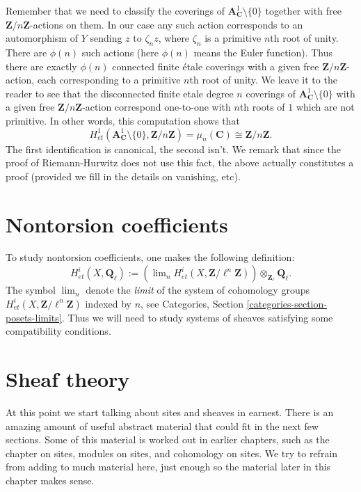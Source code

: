 \medskip\noindent
Remember that we need to classify the coverings of
${\mathbf{A}^1_\mathbf{C} \setminus \{0\}}$ together with free
$\mathbf{Z}/n\mathbf{Z}$-actions on them.
In our case any such action corresponds
to an automorphism of $Y$ sending $z$ to $\zeta_n z$, where $\zeta_n$ is a
primitive $n$th root of unity. There are $\phi(n)$ such actions
(here $\phi(n)$ means the Euler function). Thus there are exactly
$\phi(n)$ connected finite \'etale coverings with a given free
$\mathbf{Z}/n\mathbf{Z}$-action, each corresponding to a primitive
$n$th root of unity. We leave it to the reader to see that the
disconnected finite etale degree $n$ coverings of
$\mathbf{A}^1_{\mathbf{C}} \setminus \{0\}$ with a given free
$\mathbf{Z}/n\mathbf{Z}$-action correspond one-to-one with $n$th
roots of $1$ which are not primitive.
In other words, this computation shows that
$$
H_{et}^1 (\mathbf{A}^1_\mathbf{C} \setminus \{0\}, \mathbf{Z}/n\mathbf{Z})
= \mu_n(\mathbf{C}) \cong \mathbf{Z}/n\mathbf{Z}.
$$
The first identification is canonical, the second isn't. We remark that
since the proof of Riemann-Hurwitz does not use this fact, the above actually
constitutes a proof (provided we fill in the details on vanishing, etc).




\section{Nontorsion coefficients}
\label{section-nontorsion}

\noindent
To study nontorsion coefficients, one makes the following definition:
$$
H_{et}^i (X, \mathbf{Q}_\ell) :=
\left( \lim\nolimits_n H_{et}^i(X, \mathbf{Z}/\ell^n\mathbf{Z}) \right)
\otimes_{\mathbf{Z}_\ell} \mathbf{Q}_\ell.
$$
The symbol $\lim_n$ denote the {\it limit} of the system of
cohomology groups $H_{et}^i(X, \mathbf{Z}/\ell^n\mathbf{Z})$ indexed
by $n$, see
Categories, Section \ref{categories-section-posets-limits}.
Thus we will need to study systems of sheaves satisfying some compatibility
conditions. 




\section{Sheaf theory}
\label{section-sheaf-theory}

\noindent
At this point we start talking about sites and sheaves in earnest.
There is an amazing amount of useful abstract material that could fit
in the next few sections. Some of this material is worked out in earlier
chapters, such as the chapter on sites, modules on sites, and cohomology
on sites. We try to refrain from adding to much material here, just
enough so the material later in this chapter makes sense.




